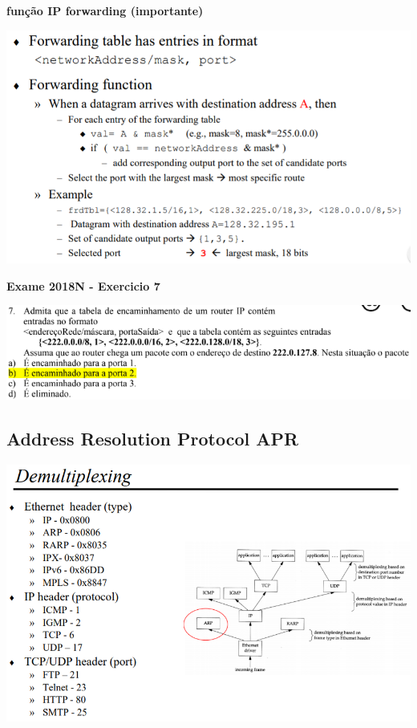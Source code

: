\documentclass{article}
\begin{document}
\textbf{função IP forwarding (importante)}
\begin{center}
    \includegraphics[width=15cm]{images/RCOM22.png}
\end{center}
\textbf{Exame 2018N - Exercicio 7}
\begin{center}
    \includegraphics[width=15cm]{images/RCOM45.png}
\end{center}

\subsection{Address Resolution Protocol APR}
\begin{center}
    \includegraphics[width=14cm]{images/RCOM23.png}
\end{center}
\end{document}
